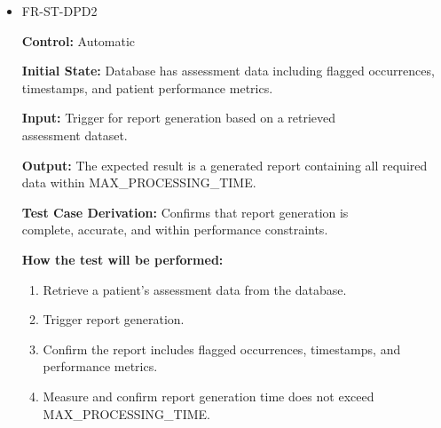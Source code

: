 \documentclass[12pt, titlepage]{article}
\begin{document}
\begin{itemize}
  \item FR-ST-DPD2
  \begin{mdframed}[linewidth=0.5mm]
      \textbf{Control:} Automatic \par
      \textbf{Initial State:} Database has assessment data including flagged occurrences,\\
      timestamps, and patient performance metrics. \par
      \textbf{Input:} Trigger for report generation based on a retrieved \\assessment dataset. \par
      \textbf{Output:} The expected result is a generated report containing all required data within MAX\_PROCESSING\_TIME. \par
      \textbf{Test Case Derivation:} Confirms that report generation is \\complete, accurate, and within performance constraints. \par
      \textbf{How the test will be performed:}
      \begin{enumerate}[noitemsep]
        \item Retrieve a patient’s assessment data from the database. 
        \item Trigger report generation. 
        \item Confirm the report includes flagged occurrences, timestamps, and \\ performance metrics. 
        \item Measure and confirm report generation time does not exceed\\ MAX\_PROCESSING\_TIME.
      \end{enumerate}
  \end{mdframed}


\end{itemize}
\end{document}
